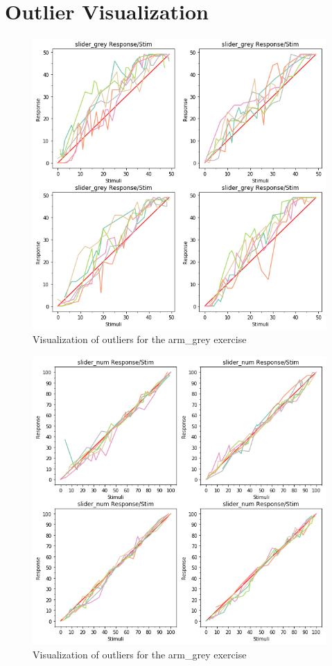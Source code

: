 \chapter{Outlier Visualization}\label{plots_appendix}
\begin{figure}[h!]
\centering
\includegraphics[width=1.1\textwidth]{figures/visual_out1.png}
\caption{Visualization of outliers for the arm\_grey exercise}
\label{NAN}
\end{figure}

\begin{figure}[h!]
\centering
\includegraphics[width=1.1\textwidth]{figures/visual_out2.png}
\caption{Visualization of outliers for the arm\_grey exercise}
\label{NAN}
\end{figure}

